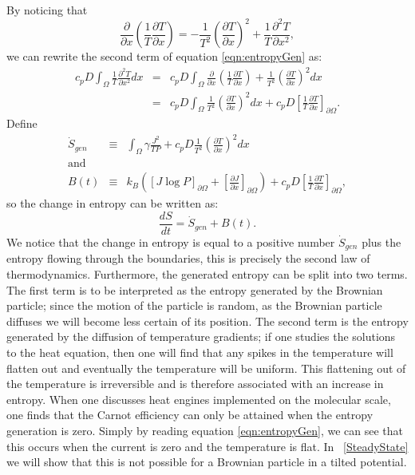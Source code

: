 By noticing that
\begin{equation}
\frac{\partial}{\partial x} \left(\frac{1}{T} \frac{\partial T}{\partial x} \right) = -\frac{1}{T^2} \left(\frac{\partial T}{\partial x} \right)^2 + \frac{1}{T} \frac{\partial^2 T}{\partial x^2},
\end{equation}
we can rewrite the second term of equation \ref{eqn:entropyGen} as:
\begin{eqnarray}
c_p D \int_{\Omega} \frac{1}{T} \frac{\partial^2 T}{\partial x^2} dx &=& c_p D \int_{\Omega} \frac{\partial}{\partial x} \left(\frac{1}{T} \frac{\partial T}{\partial x} \right) + \frac{1}{T^2} \left(\frac{\partial T}{\partial x} \right)^2 dx \\
 &=& c_p D \int_{\Omega} \frac{1}{T^2} \left(\frac{\partial T}{\partial x} \right)^2 dx + c_p D\left[\frac{1}{T} \frac{\partial T}{\partial x} \right]_{\partial \Omega}.
\end{eqnarray}
Define
\begin{eqnarray}
\dot{S}_{gen} &\equiv& \int_{\Omega} \gamma \frac{J^2}{T P} + c_p D \frac{1}{T^2} \left(\frac{\partial T}{\partial x} \right)^2 dx \label{eqn:entropyGen} \\
\text{and} \nonumber \\
B(t) &\equiv& k_B \left( [J \log P]_{\partial \Omega} + \left[\frac{\partial J}{\partial x}\right]_{\partial \Omega} \right) + c_p D\left[\frac{1}{T} \frac{\partial T}{\partial x} \right]_{\partial \Omega},
\end{eqnarray}
so the change in entropy can be written as:
\begin{equation}
\frac{d S}{d t} = \dot{S}_{gen} + B(t).
\end{equation}
We notice that the change in entropy is equal to a positive number $\dot{S}_{gen}$ plus the entropy flowing through the boundaries, this is precisely the second law of thermodynamics. Furthermore, the generated entropy can be split into two terms. The first term is to be interpreted as the entropy generated by the Brownian particle; since the motion of the particle is random, as the Brownian particle diffuses we will become less certain of its position. The second term is the entropy generated by the diffusion of temperature gradients; if one studies the solutions to the heat equation, then one will find that any spikes in the temperature will flatten out and eventually the temperature will be uniform. This flattening out of the temperature is irreversible and is therefore associated with an increase in entropy. When one discusses heat engines implemented on the molecular scale, one finds that the Carnot efficiency can only be attained when the entropy generation is zero. Simply by reading equation \ref{eqn:entropyGen}, we can see that this occurs when the current is zero and the temperature is flat. In ~\autoref{SteadyState} we will show that this is not possible for a Brownian particle in a tilted potential. 

